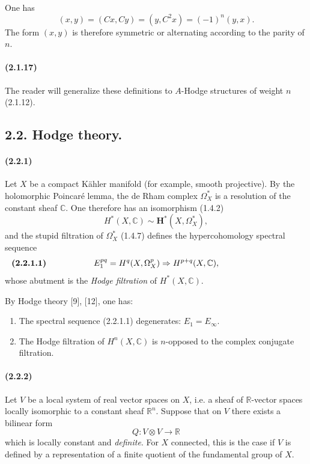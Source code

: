 \documentclass[10pt]{article}
\newcommand{\C}{\mathbb C}
\newcommand{\R}{\mathbb R}
\begin{document}
One has
\[
(x,y)=(Cx,Cy)=(y,C^2x)=(-1)^n(y,x).
\]
The form $(x,y)$ is therefore symmetric or alternating according to the parity of $n$.

\paragraph{(2.1.17)} The reader will generalize these definitions to $A$-Hodge structures of weight $n$ (2.1.12).

\subsection*{2.2. Hodge theory.}

\paragraph{(2.2.1)} Let $X$ be a compact Kähler manifold (for example, smooth projective). By the holomorphic Poincaré lemma, the de Rham complex $\Omega_X^*$ is a resolution of the constant sheaf $\C$. One therefore has an isomorphism (1.4.2)
\[
H^*(X,\C)\sim\mathbf H^*(X,\Omega_X^*),
\]
and the stupid filtration of  $\Omega_X^*$ (1.4.7) defines the hypercohomology spectral sequence
\[
\makebox[\textwidth][s]{\textbf{(2.2.1.1)}\hfill$\displaystyle E_1^{pq}=H^q(X,\Omega_X^p)\Rightarrow H^{p+q}(X,\C),$\hfill\phantom{\textbf{(2.2.1.1)}}}
\]
whose abutment is the \emph{Hodge filtration} of $H^*(X,\C)$.

By Hodge theory [9], [12], one has:
\begin{enumerate}[label=(\Alph*)]
\item The spectral sequence (2.2.1.1) degenerates: $E_1=E_\infty$.
\item The Hodge filtration of $H^n(X,\C)$ is $n$-opposed to the complex conjugate filtration.
\end{enumerate}

\paragraph{(2.2.2)} Let $V$ be a local system of real vector spaces on $X$, i.e. a sheaf of $\R$-vector spaces locally isomorphic to a constant sheaf $\R^n$. Suppose that on $V$ there exists a bilinear form
\[
Q:V\otimes V\longrightarrow\R
\]
which is locally constant and \emph{definite}. For $X$ connected, this is the case if $V$ is defined by a representation of a finite quotient of the fundamental group of $X$.
\end{document}

